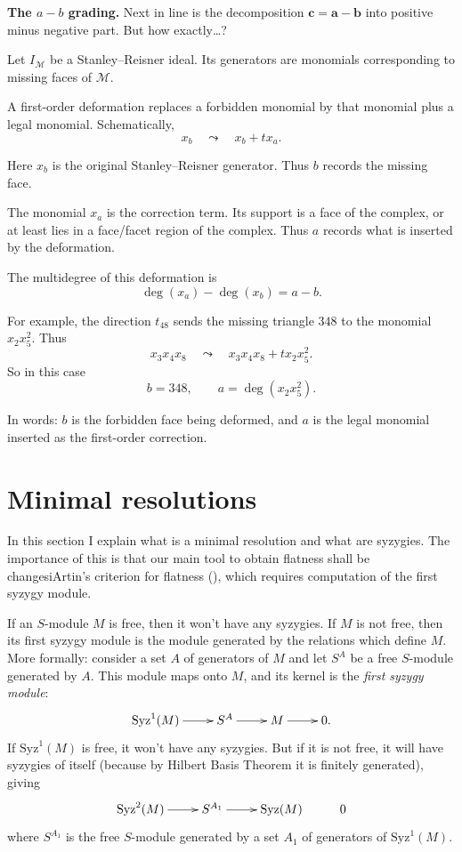 \medskip\noindent
{\bf The $a-b$ grading.}
Next in line is the decomposition
$\mathbf{c}=\mathbf{a}-\mathbf{b}$
into positive minus negative part. But how
exactly…? 

Let $I_{\mathcal M}$ be a Stanley--Reisner
ideal. Its generators are monomials
corresponding to missing faces of
$\mathcal M$.

A first-order deformation replaces a
forbidden monomial by that monomial plus a
legal monomial. Schematically,
$$
x_b \quad \leadsto \quad x_b + t x_a .
$$

Here $x_b$ is the original Stanley--Reisner
generator. Thus $b$ records the missing face.

The monomial $x_a$ is the correction term.
Its support is a face of the complex, or at
least lies in a face/facet region of the
complex. Thus $a$ records what is inserted
by the deformation.

The multidegree of this deformation is
$$
\deg(x_a)-\deg(x_b)=a-b.
$$

For example, the direction $t_{48}$ sends
the missing triangle $348$ to the monomial
$x_2x_5^2$. Thus
$$
x_3x_4x_8
\quad\leadsto\quad
x_3x_4x_8+t x_2x_5^2.
$$
So in this case
$$
b=348,
\qquad
a=\deg(x_2x_5^2).
$$

In words: $b$ is the forbidden face being
deformed, and $a$ is the legal monomial
inserted as the first-order correction.




\section{Minimal resolutions}
\label{section-minimal-resolutions}

\noindent
In this section I explain what is a minimal
resolution and what are syzygies. The
importance of this is that our main tool to
obtain flatness shall be changesiArtin's
criterion for flatness (\cite[Theorem
3.15]{Graffeo-Alessi}), which requires
computation of the first syzygy module.

\medskip\noindent
If an $S$-module $M$ is free, then it won't
have any syzygies. If $M$ is not free, then
its first syzygy module is the module
generated by the relations which define  $M$.
More formally: consider a set $A$ of
generators of $M$ and let $S^A$ be a free
$S$-module generated by $A$. This module maps
onto $M$, and its kernel is the {\it first
syzygy module}:
$$
\xymatrix{
\text{Syz}^1(M)\ar[r]
&S^A\ar[r]
&M\ar[r]
&0.
}
$$
If $\text{Syz}^1(M)$ is free, it won't have any syzygies. But if it is not free, it will have syzygies of itself (because by Hilbert Basis Theorem it is finitely generated), giving
$$
\xymatrix{
\text{Syz}^2(M)\ar[r]
&S^{A_1}\ar[r]
&\text{Syz}(M)
&0
}
$$
where $S^{A_1}$ is the free $S$-module
generated by a set $A_1$ of generators of $\text{Syz}^1(M)$.

